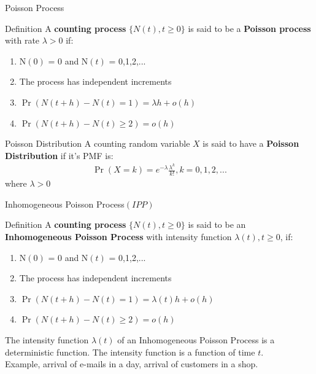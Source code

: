 \documentclass{beamer}
\providecommand{\pr}[1]{\ensuremath{\Pr\left(#1\right)}}
\providecommand{\brak}[1]{\ensuremath{\left(#1\right)}}
\begin{document}
\begin{frame}{Poisson Process}
\begin{block}{Definition}
    A \textbf{counting process} $\{N\brak t, t \ge 0\}$ is said to be a \textbf{Poisson process} with rate $\lambda > 0$ if:
    \begin{enumerate}
        \item N\brak 0 = 0 and N\brak t = 0,1,2,...
        \item The process has independent increments
        \item $\pr {N\brak{t+h} - N\brak{t} = 1} = \lambda h + o\brak h$
        \item $\pr {N\brak{t+h} - N\brak t \ge 2} = o\brak h$
    \end{enumerate}
\end{block}
\begin{block}{Poisson Distribution}
    A counting random variable $X$ is said to have a \textbf{Poisson Distribution} if it's PMF is:
    \begin{align}
        \pr{X=k}= e^{-\lambda} \frac{{\lambda}^k}{k!}, k =0,1,2,...
    \end{align}
    where $\lambda >0$
\end{block}
\end{frame}

\begin{frame}{Inhomogeneous Poisson Process\brak{IPP}}
\begin{block}{Definition}
    A \textbf{counting process} $\{N\brak t, t \ge 0\}$ is said to be an \textbf{Inhomogeneous Poisson Process} with intensity function $\lambda \brak t , t \ge 0$, if:
    \begin{enumerate}
        \item N\brak 0 = 0 and N\brak t = 0,1,2,...
        \item The process has independent increments
        \item $\pr {N\brak{t+h} - N\brak{t} = 1} = \lambda \brak t h + o\brak h$
        \item $\pr {N\brak{t+h} - N\brak t \ge 2} = o\brak h$
    \end{enumerate}
\end{block}
The intensity function $\lambda \brak t$ of an Inhomogeneous Poisson Process is a deterministic function. The intensity function is a function of time $t$.\\
Example, arrival of e-mails in a day, arrival of customers in a shop.
\end{frame}
\end{document}

